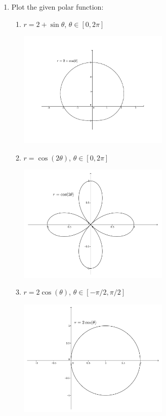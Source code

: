 \documentclass[12pt]{article}
\begin{document}
\thispagestyle{fancy}

\begin{enumerate}
 \item Plot the given polar function:
\begin{enumerate}
 \item $r=2+\sin\theta$, $\theta\in [0,2\pi]$

\begin{center}
 \includegraphics[width=0.6\textwidth]{WS6-1a}
\end{center}

 \item $r=\cos(2\theta)$, $\theta\in [0,2\pi]$

\begin{center}
 \includegraphics[width=0.6\textwidth]{WS6-1b}
\end{center}

 \item $r=2\cos(\theta)$, $\theta\in [-\pi/2,\pi/2]$

\begin{center}
 \includegraphics[width=0.6\textwidth]{WS6-1c}
\end{center}


\end{enumerate}
\end{enumerate}
\end{document}
